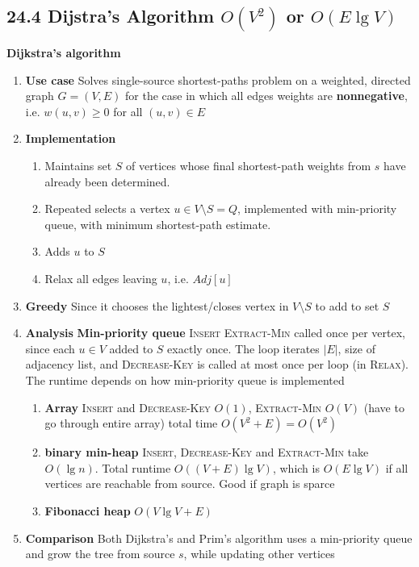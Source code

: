 \documentclass[11pt]{article}
\begin{document}
\subsection*{24.4 Dijstra's Algorithm $O(V^2)$ or $O(E\lg V)$}

\begin{defn*}
    \textbf{Dijkstra's algorithm}
    \begin{enumerate}
        \item \textbf{Use case} Solves single-source shortest-paths problem on a weighted, directed graph $G = (V,E)$ for the case in which all edges weights are \textbf{nonnegative}, i.e. $w(u,v) \geq 0$ for all $(u,v)\in E$
        \item \textbf{Implementation} 
        \begin{enumerate}
            \item Maintains set $S$ of vertices whose final shortest-path weights from $s$ have already been determined.
            \item Repeated selects a vertex $u\in V\setminus S = Q$, implemented with min-priority queue, with minimum shortest-path estimate. 
            \item Adds $u$ to $S$
            \item Relax all edges leaving $u$, i.e. $Adj[u]$
        \end{enumerate}
        \item \textbf{Greedy} Since it chooses the lightest/closes vertex in $V\setminus S$ to add to set $S$
        \item \textbf{Analysis} \textbf{Min-priority queue} \textsc{Insert} \textsc{Extract-Min} called once per vertex, since each $u\in V$ added to $S$ exactly once. The loop iterates $|E|$, size of adjacency list, and \textsc{Decrease-Key} is called at most once per loop (in \textsc{Relax}). The runtime depends on how min-priority queue is implemented 
        \begin{enumerate}
            \item \textbf{Array} \textsc{Insert} and \textsc{Decrease-Key} $O(1)$, \textsc{Extract-Min} $O(V)$ (have to go through entire array) total time $O(V^2 + E) = O(V^2)$
            \item \textbf{binary min-heap} \textsc{Insert}, \textsc{Decrease-Key} and \textsc{Extract-Min} take $O(\lg n)$. Total runtime $O((V+E)\lg V)$, which is $O(E\lg V)$ if all vertices are reachable from source. Good if graph is sparce
            \item \textbf{Fibonacci heap} $O(V\lg V + E)$
        \end{enumerate}
        \item \textbf{Comparison} Both Dijkstra's and Prim's algorithm uses a min-priority queue and grow the tree from source $s$, while updating other vertices
    \end{enumerate}
\end{defn*}
\end{document}
